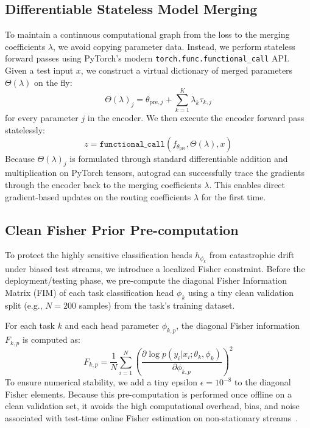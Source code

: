\documentclass{article}
\theoremstyle{plain}
\theoremstyle{definition}
\theoremstyle{remark}
\begin{document}
\subsection{Differentiable Stateless Model Merging}
To maintain a continuous computational graph from the loss to the merging coefficients $\lambda$, we avoid copying parameter data. Instead, we perform stateless forward passes using PyTorch's modern \texttt{torch.func.functional\_call} API. Given a test input $x$, we construct a virtual dictionary of merged parameters $\Theta(\lambda)$ on the fly:
\begin{equation}
    \Theta(\lambda)_j = \theta_{\text{pre}, j} + \sum_{k=1}^K \lambda_k \tau_{k, j}
\end{equation}
for every parameter $j$ in the encoder. We then execute the encoder forward pass statelessly:
\begin{equation}
    z = \texttt{functional\_call}(f_{\theta_{\text{pre}}}, \Theta(\lambda), x)
\end{equation}
Because $\Theta(\lambda)_j$ is formulated through standard differentiable addition and multiplication on PyTorch tensors, autograd can successfully trace the gradients through the encoder back to the merging coefficients $\lambda$. This enables direct gradient-based updates on the routing coefficients $\lambda$ for the first time.

\subsection{Clean Fisher Prior Pre-computation}
To protect the highly sensitive classification heads $h_{\phi_k}$ from catastrophic drift under biased test streams, we introduce a localized Fisher constraint. Before the deployment/testing phase, we pre-compute the diagonal Fisher Information Matrix (FIM) of each task classification head $\phi_k$ using a tiny clean validation split (e.g., $N=200$ samples) from the task's training dataset. 

For each task $k$ and each head parameter $\phi_{k, p}$, the diagonal Fisher information $F_{k, p}$ is computed as:
\begin{equation}
    F_{k, p} = \frac{1}{N} \sum_{i=1}^N \left( \frac{\partial \log p(y_i | x_i; \theta_k, \phi_k)}{\partial \phi_{k, p}} \right)^2
\end{equation}
To ensure numerical stability, we add a tiny epsilon $\epsilon = 10^{-8}$ to the diagonal Fisher elements. Because this pre-computation is performed once offline on a clean validation set, it avoids the high computational overhead, bias, and noise associated with test-time online Fisher estimation on non-stationary streams~\citep{symerge2026sbf}.
\end{document}
